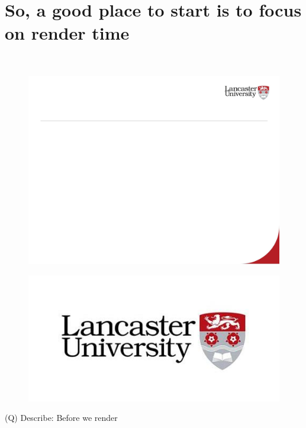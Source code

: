 \documentclass[12pt]{article}
\begin{document}
\section{So, a good place to start is to focus on render time}
\\
\begin{figure}[H]
\includegraphics[width=0.5\linewidth]{page44-image-1.png}
\end{figure}
\begin{figure}[H]
\includegraphics[width=0.5\linewidth]{page44-image-2.png}
\end{figure}
\clearpage
(Q)
Describe: Before we render
\clearpage
\end{document}
